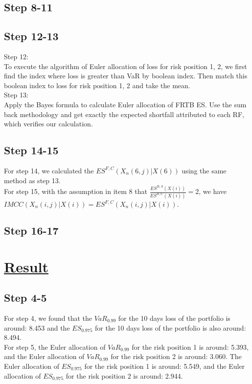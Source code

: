 \documentclass{article}
\begin{document}
\subsection*{Step 8-11}
\subsection*{Step 12-13}
Step 12:\\
To execute the algorithm of Euler allocation of loss for risk position 1, 2, we first find the index where loss is greater than VaR by boolean index. Then match this boolean index to loss for risk position 1, 2 and take the mean.
\\Step 13:\\
Apply the Bayes formula to calculate Euler allocation of FRTB ES.
Use the sum back methodology and get exactly the expected shortfall attributed to each RF, which verifies our calculation.

\subsection*{Step 14-15}
For step 14, we calculated the $ES^{F,C}(X_n(6,j)|X(6))$ using the same method as step 13.
\\For step 15, with the assumption in item 8 that $\frac {ES^{R,S}(X(i))} {ES^{R,C}(X(i))} = 2$, we have $IMCC(X_n(i,j)|X(i))=ES^{F,C}(X_n(i,j)|X(i))$.
\subsection*{Step 16-17}
\section*{\underline{Result}}

\subsection*{Step 4-5}
For step 4, we found that the $VaR_{0.99}$ for the 10 days loss of the portfolio is around: 8.453 and the $ES_{0.975}$ for the 10 days loss of the portfolio is also around: 8.494.
\\For step 5, the Euler allocation of $VaR_{0.99}$ for the risk position 1 is around: 5.393, and the Euler allocation of $VaR_{0.99}$ for the risk position 2 is around: 3.060. The Euler allocation of $ES_{0.975}$ for the risk position 1 is around: 5.549, and the Euler allocation of $ES_{0.975}$ for the risk position 2 is around: 2.944.
\end{document}
